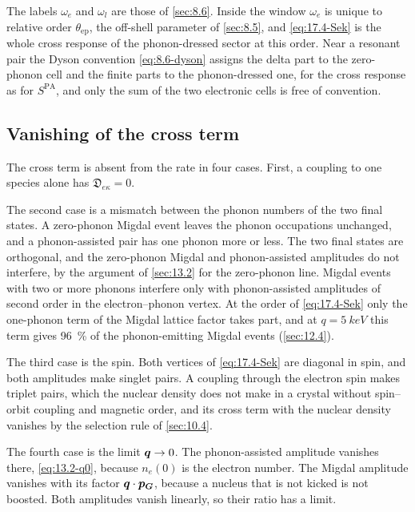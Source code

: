 The labels $\omega_e$ and $\omega_l$ are those of \cref{sec:8.6}. Inside the window $\omega_e$ is unique to relative order $\theta_{\mathrm{ep}}$, the off-shell parameter of \cref{sec:8.5}, and \cref{eq:17.4-Sek} is the whole cross response of the phonon-dressed sector at this order. Near a resonant pair the Dyson convention \cref{eq:8.6-dyson} assigns the delta part to the zero-phonon cell and the finite parts to the phonon-dressed one, for the cross response as for $S^{\mathrm{PA}}$, and only the sum of the two electronic cells is free of convention.

\subsection{Vanishing of the cross term}\label{sec:17.4-zero}

The cross term is absent from the rate in four cases. First, a coupling to one species alone has $\mathfrak{D}_{e\kappa} = 0$.

The second case is a mismatch between the phonon numbers of the two final states. A zero-phonon Migdal event leaves the phonon occupations unchanged, and a phonon-assisted pair has one phonon more or less. The two final states are orthogonal, and the zero-phonon Migdal and phonon-assisted amplitudes do not interfere, by the argument of \cref{sec:13.2} for the zero-phonon line. Migdal events with two or more phonons interfere only with phonon-assisted amplitudes of second order in the electron--phonon vertex. At the order of \cref{eq:17.4-Sek} only the one-phonon term of the Migdal lattice factor takes part, and at $q = \SI{5}{keV}$ this term gives \SI{96}{\percent} of the phonon-emitting Migdal events (\cref{sec:12.4}).

The third case is the spin. Both vertices of \cref{eq:17.4-Sek} are diagonal in spin, and both amplitudes make singlet pairs. A coupling through the electron spin makes triplet pairs, which the nuclear density does not make in a crystal without spin--orbit coupling and magnetic order, and its cross term with the nuclear density vanishes by the selection rule of \cref{sec:10.4}.

The fourth case is the limit $\bm{q} \to 0$. The phonon-assisted amplitude vanishes there, \cref{eq:13.2-q0}, because $n_e(0)$ is the electron number. The Migdal amplitude vanishes with its factor $\bm{q}\cdot\bm{p}_{\bm{G}}$, because a nucleus that is not kicked is not boosted. Both amplitudes vanish linearly, so their ratio has a limit.

